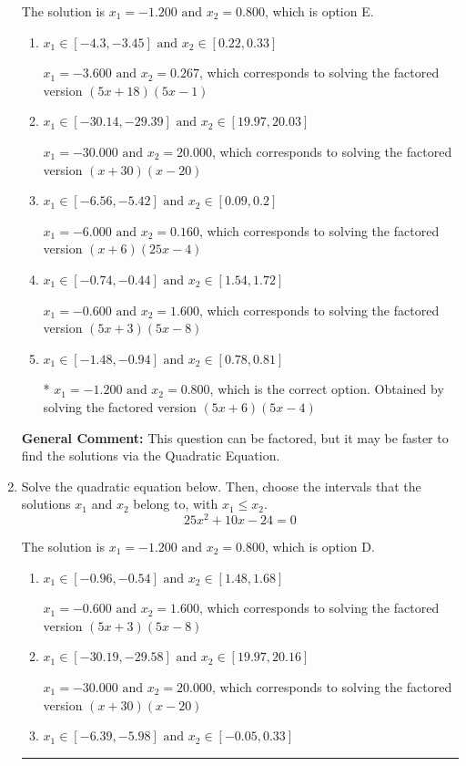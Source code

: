 \documentclass{extbook}[14pt]
\newcommand{\litem}[1]{\item #1

\rule{\textwidth}{0.4pt}}
\begin{document}
\begin{enumerate}
{The solution is \( x_1 = -1.200 \text{ and } x_2 = 0.800 \), which is option E.\begin{enumerate}[label=\Alph*.]
\item \( x_1 \in [-4.3, -3.45] \text{ and } x_2 \in [0.22, 0.33] \)

$x_1 = -3.600 \text{ and } x_2 = 0.267$, which corresponds to solving the factored version $(5x + 18)(5x -1)$
\item \( x_1 \in [-30.14, -29.39] \text{ and } x_2 \in [19.97, 20.03] \)

$x_1 = -30.000 \text{ and } x_2 = 20.000$, which corresponds to solving the factored version $(x + 30)(x -20)$
\item \( x_1 \in [-6.56, -5.42] \text{ and } x_2 \in [0.09, 0.2] \)

$x_1 = -6.000 \text{ and } x_2 = 0.160$, which corresponds to solving the factored version $(x + 6)(25x -4)$
\item \( x_1 \in [-0.74, -0.44] \text{ and } x_2 \in [1.54, 1.72] \)

$x_1 = -0.600 \text{ and } x_2 = 1.600$, which corresponds to solving the factored version $(5x + 3)(5x -8)$
\item \( x_1 \in [-1.48, -0.94] \text{ and } x_2 \in [0.78, 0.81] \)

* $x_1 = -1.200 \text{ and } x_2 = 0.800$, which is the correct option. Obtained by solving the factored version $(5x + 6)(5x -4)$
\end{enumerate}

\textbf{General Comment:} This question can be factored, but it may be faster to find the solutions via the Quadratic Equation.
}
\litem{
Solve the quadratic equation below. Then, choose the intervals that the solutions $x_1$ and $x_2$ belong to, with $x_1 \leq x_2$.
\[ 25x^{2} +10 x -24 = 0 \]

The solution is \( x_1 = -1.200 \text{ and } x_2 = 0.800 \), which is option D.\begin{enumerate}[label=\Alph*.]
\item \( x_1 \in [-0.96, -0.54] \text{ and } x_2 \in [1.48, 1.68] \)

$x_1 = -0.600 \text{ and } x_2 = 1.600$, which corresponds to solving the factored version $(5x + 3)(5x -8)$
\item \( x_1 \in [-30.19, -29.58] \text{ and } x_2 \in [19.97, 20.16] \)

$x_1 = -30.000 \text{ and } x_2 = 20.000$, which corresponds to solving the factored version $(x + 30)(x -20)$
\item \( x_1 \in [-6.39, -5.98] \text{ and } x_2 \in [-0.05, 0.33] \)


\end{enumerate}}
\end{enumerate}
\end{document}
